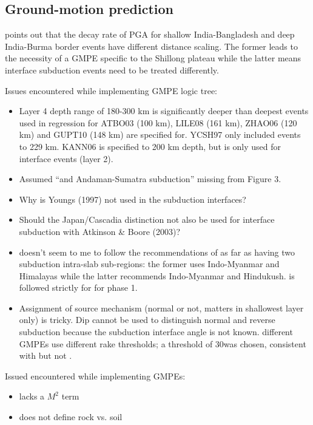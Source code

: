 \documentclass{article}
\begin{document}
\subsection{Ground-motion prediction}
\label{sec:GroundMotion}

\cite{sharma2009ground} points out that the decay rate of PGA for shallow India-Bangladesh and deep India-Burma border events have different distance scaling. The former leads to the necessity of a GMPE specific to the Shillong plateau \cite{nath2012ground} while the latter means interface subduction events need to be treated differently. 

Issues encountered while implementing GMPE logic tree:
\begin{itemize}
\item Layer 4 depth range of 180-300 km is significantly deeper than deepest events used in regression for ATBO03 (100 km), LILE08 (161 km), ZHAO06 (120 km) and GUPT10 (148 km) are specified for. YCSH97 only included events to 229 km. KANN06 is specified to 200 km depth, but is only used for interface events (layer 2).
\item Assumed “and Andaman-Sumatra subduction” missing from Figure 3.
\item Why is Youngs (1997) not used in the subduction interfaces?
\item Should the Japan/Cascadia distinction not also be used for interface subduction with Atkinson \& Boore (2003)?
\item \cite{nath2012probabilistic} doesn't seem to me to follow the recommendations of \cite{nath2011peak} as far as having two subduction intra-slab sub-regions: the former uses Indo-Myanmar and Himalayas while the latter recommends Indo-Myanmar and Hindukush. \cite{nath2012probabilistic} is followed strictly for for phase 1.
\item Assignment of source mechanism (normal or not, matters in shallowest layer only) is tricky.  Dip cannot be used to distinguish normal and reverse subduction because the subduction interface angle is not known. different GMPEs use different rake thresholds; a threshold of 30\degree\space was chosen, consistent with \cite{boore2008ground, campbell2008nga} but not \cite{zhao2006attenuation}.
\end{itemize}

Issued encountered while implementing GMPEs:

\cite{sharma2009ground}
\begin{itemize}
\item lacks a $M^2$ term \cite{cotton2006criteria}
\item does not define rock vs. soil
\end{itemize}
\end{document}
